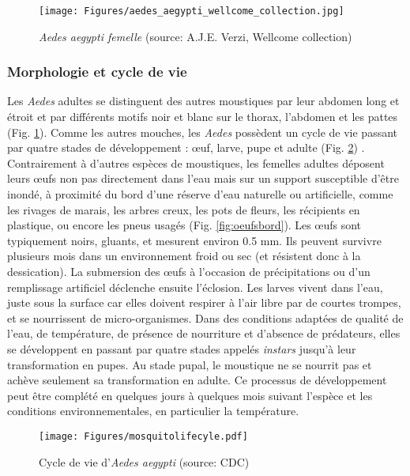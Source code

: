 \begin{figure}[t]
	\centering
	\texttt{[image: Figures/aedes\_aegypti\_wellcome\_collection.jpg]}
	\caption{{\em Aedes aegypti femelle} (source: A.J.E. Verzi, Wellcome collection)}
	\label{fig:aedesvexans}
\end{figure}

\subsubsection{Morphologie et cycle de vie}
Les {\em Aedes} adultes se distinguent des autres moustiques par leur abdomen long et étroit et par différents motifs noir et blanc sur le thorax, l'abdomen et les pattes (Fig. \ref{fig:aedesvexans}).
Comme les autres mouches, les {\em Aedes} possèdent un cycle de vie passant par quatre stades de développement : \oe uf, larve, pupe et adulte (Fig. \ref{fig:mosquitolifecyle}) \cite{christophers1960aedes}.
Contrairement à d'autres espèces de moustiques, les femelles adultes déposent leurs \oe ufs non pas directement dans l'eau mais sur un support susceptible d'être inondé, à proximité du bord d'une réserve d'eau naturelle ou artificielle, comme les rivages de marais, les arbres creux, les pots de fleurs, les récipients en plastique, ou encore les pneus usagés (Fig. \ref{fig:oeufsbord}).
Les \oe ufs sont typiquement noirs, gluants, et mesurent environ 0.5 mm.
Ils peuvent survivre plusieurs mois dans un environnement froid ou sec (et résistent donc à la dessication).
La submersion des \oe ufs à l'occasion de précipitations ou d'un remplissage artificiel déclenche ensuite l'éclosion.
Les larves vivent dans l'eau, juste sous la surface car elles doivent respirer à l'air libre par de courtes trompes, et se nourrissent de micro-organismes. 
Dans des conditions adaptées de qualité de l'eau, de température, de présence de nourriture et d'absence de prédateurs, elles se développent en passant par quatre stades appelés {\em instars} jusqu'à leur transformation en pupes.
Au stade pupal, le moustique ne se nourrit pas et achève seulement sa transformation en adulte.
Ce processus de développement peut être complété en quelques jours à quelques mois suivant l'espèce et les conditions environnementales, en particulier la température.


\begin{figure}[h]
	\centering
	\texttt{[image: Figures/mosquitolifecyle.pdf]}
	\caption{Cycle de vie d'{\em Aedes aegypti} (source: CDC)}
	\label{fig:mosquitolifecyle}
\end{figure}

